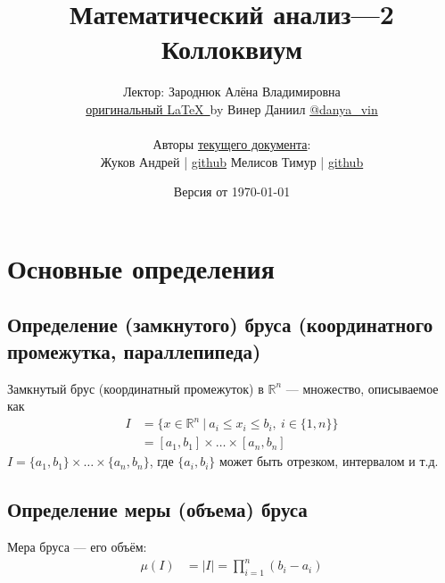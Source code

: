 \documentclass[a4paper]{article}
\begin{document}
\title{\LARGE{Математический анализ—2}\\ Коллоквиум}
\author{Лектор: Зароднюк Алёна Владимировна\\
\href{https://github.com/vinerdanya/EDS-Study/blob/main/2nd\%20course/Calculus-2/Colloquim/Colloquim.pdf}{оригинальный \LaTeX\ }by Винер Даниил \href{https://t.me/danya_vin}{@danya\_vin}
\\
\\
Авторы \href{https://hse-tex.me/course-2/mathematical-analysis.pdf}{текущего документа}:
\\
Жуков Андрей | \href{https://github.com/shiro-eden}{github} \qquad
Мелисов Тимур | \href{https://github.com/coffecat46}{github}}
\date{Версия от \today}
\maketitle

\tableofcontents
\newpage
\setlength{\parindent}{15pt}
\setlength{\parskip}{2mm}
\section{Основные определения}
\subsection{Определение (замкнутого) бруса (координатного промежутка, параллепипеда)}
 Замкнутый брус (координатный промежуток) в $\mathbb{R}^n$ — множество, описываемое как
\begin{equation*}
\begin{aligned}
    I&=\{x\in\mathbb{R}^n\ |\ a_i\leq x_i\leq b_i,\ i\in\{1,n\}\}\\
    &=\left[a_1,b_1\right]\times\ldots\times\left[a_n,b_n\right]
\end{aligned}
\end{equation*}
\comment $I=\{a_1,b_1\}\times\ldots\times\{a_n,b_n\}$, где $\{a_i, b_i\}$ может быть отрезком, интервалом и т.д.
\begin{center}
    
\end{center}

\subsection{Определение меры (объема) бруса}
 Мера бруса — его объём:
\begin{equation*}
    \begin{aligned}
        \mu(I)&=|I|
        =\prod_{i=1}^{n} (b_i-a_i)
    \end{aligned}
\end{equation*}
\end{document}

